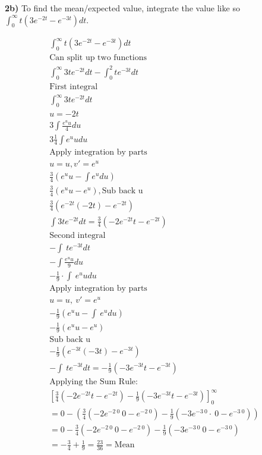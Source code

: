 \documentclass[oneside, a4paper]{article}
\begin{document}
\textbf{2b)} To find the mean/expected value, integrate the value like so $\int _{0}^{\infty} t (3e^{-2t}-e^{-3t}) dt$.

\begin{equation}
    \begin{split}
        \int _{0}^{\infty} t (3e^{-2t}-e^{-3t}) dt\\ 
        \text{Can split up two functions} \\
        \int _{0}^{\infty} 3te^{-2t} dt - \int _{0}^{2} te^{-3t} dt\\
        \text{First integral} \\
        \int _{0}^{\infty} 3te^{-2t} dt \\
        u = -2t \\
        3 \int \frac{e^uu}{4} du \\
        3 \frac{1}{4} \int e^uudu \\
        \text{Apply integration by parts}\\
        u=u, v'=e^u \\
        \frac{3}{4}\left(e^uu-\int e^udu\right) \\
        \frac{3}{4}\left(e^uu-e^u\right), \text{Sub back u} \\
        \frac{3}{4}\left(e^{-2t}\left(-2t\right)-e^{-2t}\right) \\
        \int 3te^{-2t}dt = \frac{3}{4}\left(-2e^{-2t}t-e^{-2t}\right) \\ %
        \text{Second integral} \\
        -\int \:te^{-3t}dt\\
        -\int \frac{e^uu}{9}du\\
        -\frac{1}{9}\cdot \int \:e^uudu \\
        \text{Apply integration by parts}\\
        u=u,\:v'=e^u \\
        -\frac{1}{9}\left(e^uu-\int \:e^udu\right) \\
        -\frac{1}{9}\left(e^uu-e^u\right) \\
        \text{Sub back u} \\
        -\frac{1}{9}\left(e^{-3t}\left(-3t\right)-e^{-3t}\right) \\
        -\int \:te^{-3t}dt = -\frac{1}{9}\left(-3e^{-3t}t-e^{-3t}\right) \\%
        \text{Applying the Sum Rule:}\\
        \left[\frac{3}{4}\left(-2e^{-2t}t-e^{-2t}\right)-\frac{1}{9}\left(-3e^{-3t}t-e^{-3t}\right)\right]^{\infty}_{0} \\
        = 0 - \left(\frac{3}{4}\left(-2e^{-2 \:0} \:0-e^{-2 \:0}\right)-\frac{1}{9}\left(-3e^{-3 \:0}\cdot \:0-e^{-3 \:0}\right)\right) \\
        = 0 - \frac{3}{4}\left(-2e^{-2 \:0} \:0-e^{-2 \:0}\right) - \frac{1}{9}\left(-3e^{-3 \:0} \:0-e^{-3 \:0}\right) \\ 
        = -\frac{3}{4} + \frac{1}{9} = \frac{23}{36} = \text{Mean}
    \end{split}
\end{equation}
\end{document}
